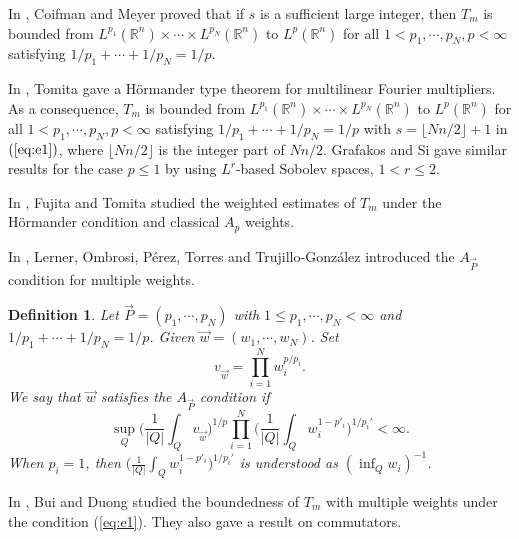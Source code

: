 \documentclass[11pt,oneside,onecolumn]{amsart}
\numberwithin{equation}{section}
\newtheorem{Definition}[Theorem]{Definition}
\begin{document}
In \cite{CM}, Coifman and Meyer proved that if $s$ is a sufficient large integer, then
$T_m$ is bounded from $L^{p_1}({\mathbb{R}}^n)\times \cdots \times L^{p_N}({\mathbb{R}}^n)$ to $L^p({\mathbb{R}}^n)$ for
all $1<p_1,\cdots,p_N,p<\infty$ satisfying $1/{p_1}+\cdots+1/{p_N}=1/p$.

In \cite{T}, Tomita gave a H\"{o}rmander type theorem for multilinear Fourier multipliers.
As a consequence, $T_m$ is bounded from $L^{p_1}({\mathbb{R}}^n)\times \cdots \times L^{p_N}({\mathbb{R}}^n)$ to $L^p({\mathbb{R}}^n)$ for
all $1<p_1,\cdots,p_N,p<\infty$ satisfying $1/{p_1}+\cdots+1/{p_N}=1/p$ with
$s=\lfloor Nn/2\rfloor+1$ in $(\ref{eq:e1})$, where $\lfloor Nn/2\rfloor$ is the integer part of $Nn/2$.
Grafakos and Si \cite{GS} gave similar results for the case $p\le 1$ by using   $L^r$-based Sobolev spaces,
$1 < r \le2$.

In \cite{FT}, Fujita and Tomita studied the weighted estimates of $T_m$ under the H\"{o}rmander condition and
classical $A_p$ weights.

In \cite{LOPTG}, Lerner,  Ombrosi, P\'{e}rez,  Torres and  Trujillo-Gonz\'{a}lez
introduced the $A_{\vec{P}}$ condition for multiple weights.
\begin{Definition}
Let $\vec{P}=(p_1,\cdots, p_N)$ with $1\le p_1, \cdots, p_N<\infty$ and $1/{p_1}+\cdots+1/{p_N}=1/p$. Given $\vec{w}=(w_1, \cdots, w_N)$. Set
\[
  v^{}_{\vec{w}}=\prod_{i=1}^N w_i^{p/{p_i}}.
\]
We say that $\vec{w}$ satisfies the $A_{\vec{P}}$ condition if
\begin{equation}\label{eq:e2}
\sup_Q\bigg( \frac{1}{|Q|}\int_Q v^{}_{\vec{w}}\bigg)^{1/p}
    \prod_{i=1}^N\bigg(\frac{1}{|Q|}\int_Q w_i^{1-p'_i}\bigg)^{1/{p_i'}}<\infty.
\end{equation}
When $p_i=1$, then $\bigg(\frac{1}{|Q|}\int_Q w_i^{1-p'_i}\bigg)^{1/{p_i'}}$ is understood as $(\inf_Q w_i)^{-1}$.
\end{Definition}

In \cite{BD}, Bui and Duong studied the boundedness of  $T_m$ with multiple weights under the condition (\ref{eq:e1}).
They also gave a result on commutators.
\end{document}
